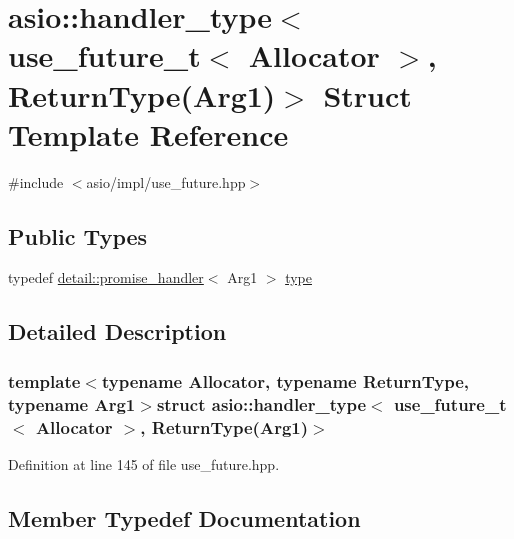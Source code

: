 \hypertarget{structasio_1_1handler__type_3_01use__future__t_3_01_allocator_01_4_00_01_return_type_07_arg1_08_4}{}\section{asio\+:\+:handler\+\_\+type$<$ use\+\_\+future\+\_\+t$<$ Allocator $>$, Return\+Type(Arg1)$>$ Struct Template Reference}
\label{structasio_1_1handler__type_3_01use__future__t_3_01_allocator_01_4_00_01_return_type_07_arg1_08_4}


{\ttfamily \#include $<$asio/impl/use\+\_\+future.\+hpp$>$}

\subsection*{Public Types}
\begin{DoxyCompactItemize}
\item 
typedef \hyperlink{classasio_1_1detail_1_1promise__handler}{detail\+::promise\+\_\+handler}$<$ Arg1 $>$ \hyperlink{structasio_1_1handler__type_3_01use__future__t_3_01_allocator_01_4_00_01_return_type_07_arg1_08_4_aa4bca092e3f7ab436ab9a136bbae80f5}{type}
\end{DoxyCompactItemize}


\subsection{Detailed Description}
\subsubsection*{template$<$typename Allocator, typename Return\+Type, typename Arg1$>$struct asio\+::handler\+\_\+type$<$ use\+\_\+future\+\_\+t$<$ Allocator $>$, Return\+Type(\+Arg1)$>$}



Definition at line 145 of file use\+\_\+future.\+hpp.



\subsection{Member Typedef Documentation}
\hypertarget{structasio_1_1handler__type_3_01use__future__t_3_01_allocator_01_4_00_01_return_type_07_arg1_08_4_aa4bca092e3f7ab436ab9a136bbae80f5}{}
